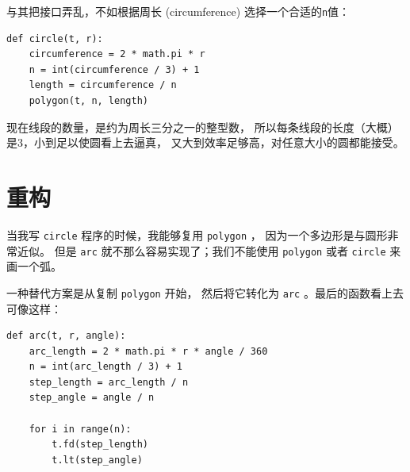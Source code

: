 
与其把接口弄乱，不如根据周长 (circumference) 选择一个合适的\lstinline{n}值：

\begin{lstlisting}
def circle(t, r):
    circumference = 2 * math.pi * r
    n = int(circumference / 3) + 1
    length = circumference / n
    polygon(t, n, length)
\end{lstlisting}

%

现在线段的数量，是约为周长三分之一的整型数，
所以每条线段的长度（大概）是3，小到足以使圆看上去逼真，
又大到效率足够高，对任意大小的圆都能接受。

\section{重构}
\label{refactoring}
  


当我写 \lstinline{circle} 程序的时候，我能够复用 \lstinline{polygon} ，
因为一个多边形是与圆形非常近似。
但是 \lstinline{arc} 就不那么容易实现了；我们不能使用 \lstinline{polygon} 或者 \lstinline{circle} 来画一个弧。


一种替代方案是从复制 \lstinline{polygon} 开始，
然后将它转化为 \lstinline{arc} 。最后的函数看上去可像这样：

\begin{lstlisting}
def arc(t, r, angle):
    arc_length = 2 * math.pi * r * angle / 360
    n = int(arc_length / 3) + 1
    step_length = arc_length / n
    step_angle = angle / n

    for i in range(n):
        t.fd(step_length)
        t.lt(step_angle)
\end{lstlisting}

